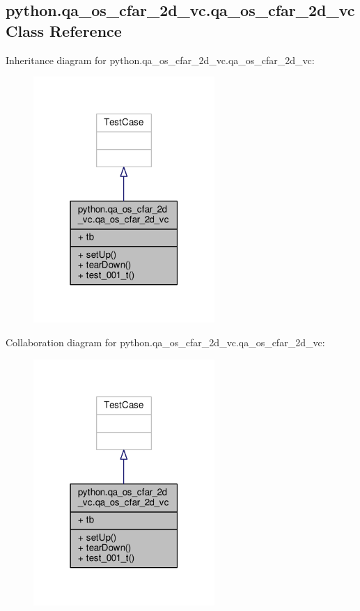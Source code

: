 \subsection{python.\+qa\+\_\+os\+\_\+cfar\+\_\+2d\+\_\+vc.\+qa\+\_\+os\+\_\+cfar\+\_\+2d\+\_\+vc Class Reference}
\label{classpython_1_1qa__os__cfar__2d__vc_1_1qa__os__cfar__2d__vc}


Inheritance diagram for python.\+qa\+\_\+os\+\_\+cfar\+\_\+2d\+\_\+vc.\+qa\+\_\+os\+\_\+cfar\+\_\+2d\+\_\+vc\+:
\nopagebreak
\begin{figure}[H]
\begin{center}
\leavevmode
\includegraphics[width=195pt]{df/df5/classpython_1_1qa__os__cfar__2d__vc_1_1qa__os__cfar__2d__vc__inherit__graph}
\end{center}
\end{figure}


Collaboration diagram for python.\+qa\+\_\+os\+\_\+cfar\+\_\+2d\+\_\+vc.\+qa\+\_\+os\+\_\+cfar\+\_\+2d\+\_\+vc\+:
\nopagebreak
\begin{figure}[H]
\begin{center}
\leavevmode
\includegraphics[width=195pt]{d5/d46/classpython_1_1qa__os__cfar__2d__vc_1_1qa__os__cfar__2d__vc__coll__graph}
\end{center}
\end{figure}
